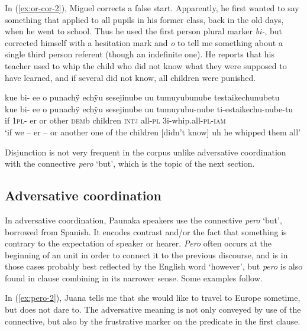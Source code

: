 In (\ref{ex:or-cor-2}), Miguel corrects a false start. Apparently, he first wanted to say something that applied to all pupils in his former class, back in the old days, when he went to school. Thus he used the first person plural marker \textit{bi-}, but corrected himself with a hesitation mark and \textit{o} to tell me something about a single third person referent (though an indefinite one). He reports that his teacher used to whip the child who did not know what they were supposed to have learned, and if several did not know, all children were punished.

\ea\label{ex:or-cor-2}
\begingl
\glpreamble kue bi- ee o punachÿ echÿu sesejinube uu tumuyubunube testaikechunubetu\\
\gla kue bi- ee o punachÿ echÿu sesejinube uu tumuyubu-nube ti-estaikechu-nube-tu\\
\glb if 1\textsc{pl}- er or other \textsc{dem}b children \textsc{intj} all-\textsc{pl} 3i-whip.all-\textsc{pl}-\textsc{iam}\\
\glft ‘if we – er – or another one of the children [didn’t know] uh he whipped them all’
\endgl
\trailingcitation{[mxx-p181027l-1.077]}
\xe 

Disjunction is not very frequent in the corpus unlike adversative coordination with the connective \textit{pero} ‘but’, which is the topic of the next section.

\subsection{Adversative coordination}\label{sec:AdversativeCoordination}

In adversative coordination, Paunaka speakers use the connective \textit{pero} ‘but’,  borrowed from Spanish. It encodes contrast and/or the fact that something is contrary to the expectation of speaker or hearer. \textit{Pero} often occurs at the beginning of an  unit in order to connect it to the previous discourse, and is in those cases probably best reflected by the English word ‘however’, but \textit{pero} is also found in clause combining in its narrower sense. Some examples follow.

In (\ref{ex:pero-2}), Juana tells me that she would like to travel to Europe sometime, but does not dare to. The adversative meaning is not only conveyed by use of the connective, but also by the frustrative marker on the predicate in the first clause.

